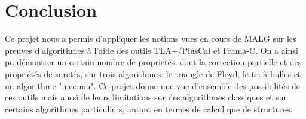 \documentclass[a4paper,11pt, oneside]{book}
\begin{document}
	\chapter{Conclusion}

		Ce projet nous a permis d'appliquer les notions vues en cours de MALG sur les
		preuves d'algorithmes à l'aide des outils TLA+/PlusCal et Frama-C. On a ainsi
		pu démontrer un certain nombre de propriétés, dont la correction partielle et
		des propriétés de suretés, sur trois algorithmes: le triangle de Floyd,
		le tri à bulles et un algorithme "inconnu". Ce projet donne une vue d'ensemble
		des possibilités de ces outils mais aussi de leurs limitations sur des
		algorithmes classiques et sur certains algorithmes particuliers, autant en
		termes de calcul que de structures.
\end{document}
